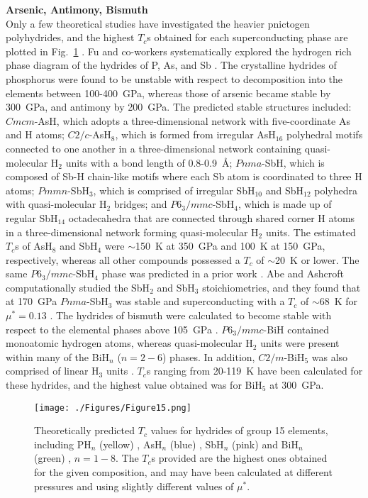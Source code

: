 \documentclass[12pt,letterpaper,oneside]{article}
\begin{document}
\noindent\textbf{Arsenic, Antimony, Bismuth} \\ 
Only a few theoretical studies have investigated the heavier pnictogen polyhydrides, and the highest $T_c$s obtained for each superconducting phase are plotted in Fig.\ \ref{fig:Group15} \cite{Fu:2016a, YanbinMa:2015b, Abe:2015a, YanbinMa:2015a}. Fu and co-workers systematically explored the hydrogen rich phase diagram of the hydrides of P, As, and Sb \cite{Fu:2016a}. The crystalline hydrides of phosphorus were found to be unstable with respect to decomposition into the elements between 100-400~GPa, whereas those of arsenic became stable by 300~GPa, and antimony by 200~GPa. The predicted stable structures included: $Cmcm$-AsH, which adopts a three-dimensional network with five-coordinate As and H atoms; $C2/c$-AsH$_8$, which is formed from irregular AsH$_{16}$ polyhedral motifs connected to one another in a three-dimensional network containing quasi-molecular H$_{2}$ units with a bond length of 0.8-0.9~\AA{}; $Pnma$-SbH, which is composed of Sb-H chain-like motifs where each Sb atom is coordinated to three H atoms; $Pmmn$-SbH$_3$, which is comprised of irregular SbH$_{10}$ and SbH$_{12}$ polyhedra with quasi-molecular H$_{2}$ bridges; and $P6_3/mmc$-SbH$_4$, which is made up of regular SbH$_{14}$ octadecahedra that are connected through shared  corner H atoms in a three-dimensional network forming quasi-molecular H$_{2}$ units. The estimated $T_c$s of AsH$_8$ and SbH$_4$ were $\sim$150~K at 350~GPa and 100~K at 150~GPa, respectively, whereas all other compounds possessed a $T_c$ of $\sim$20~K or lower. The same $P6_3/mmc$-SbH$_4$ phase was predicted in a prior work \cite{YanbinMa:2015b}. Abe and Ashcroft computationally studied the SbH$_2$ and SbH$_3$ stoichiometries, and they found that at 170~GPa $Pnma$-SbH$_3$ was stable and superconducting with a $T_c$ of $\sim$68~K for $\mu^*=0.13$ \cite{Abe:2015a}. The hydrides of bismuth were calculated to become stable with respect to the elemental phases above 105~GPa \cite{YanbinMa:2015a, Abe:2015a}. $P6_3/mmc$-BiH contained monoatomic hydrogen atoms, whereas quasi-molecular H$_2$ units were present within many of the BiH$_n$ ($n=2-6$) phases. In addition, $C2/m$-BiH$_{5}$ was also comprised of linear H$_{3}$ units \cite{YanbinMa:2015a}. $T_c$s ranging from 20-119~K have been calculated for these hydrides, and the highest value obtained was for BiH$_5$ at 300~GPa. 

\begin{figure}[h!]
\begin{center}
\texttt{[image: ./Figures/Figure15.png]}
\end{center}
\caption{Theoretically predicted $T_c$ values for hydrides of group 15 elements, including PH$_n$ (yellow) \cite{Flores:2016-P,Shamp:2016a,Liu:2016-P,Bi:2017-P,Durajski:2016-S-P}, AsH$_n$ (blue) \cite{Fu:2016a}, SbH$_n$ (pink) \cite{YanbinMa:2015b,Fu:2016a,Abe:2015a} and BiH$_n$ (green) \cite{Abe:2015a,YanbinMa:2015a}, $n=1-8$. The $T_c$s provided are the highest ones obtained for the given composition, and may have been calculated at different pressures and using slightly different values of $\mu^*$.}
\label{fig:Group15}
\end{figure}
\end{document}
